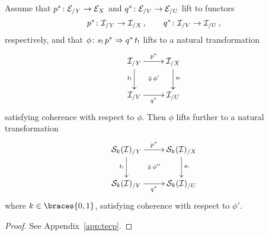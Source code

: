 \documentclass[reqno,10pt,a4paper,oneside,draft]{amsart}
\begin{document}
\begin{lemma} \label{strong-h-equiv-base-change-along-fibration-BC}
Assume that $p^* \colon \mathcal{E}_{/Y} \to \mathcal{E}_{X}$ and $q^* \colon \mathcal{E}_{/V} \to \mathcal{E}_{/U}$ lift to functors
\[
  p^* \colon \mathcal{I}_{/Y} \to \mathcal{I}_{/X}
\, , \qquad
  q^* \colon \mathcal{I}_{/V} \to \mathcal{I}_{/U}
\, ,
\]
respectively, and that  $\phi \colon s_! \, p^* \Rightarrow q^* \, t_{!}$ lifts to a natural transformation
\begin{equation} \label{strong-h-equiv-base-change-along-fibration-BC:2}
\begin{gathered}
\xymatrix{
  \cal{I}_{/Y}
  \ar[r]^{p^*}
  \ar[d]_{t_!}
  \ar@{}[dr]|{\Downarrow \, \phi'}
&
  \cal{I}_{/X}
  \ar[d]^{s_!}
\\
  \cal{I}_{/V}
  \ar[r]_{q^*}
&
  \cal{I}_{/U}
}
\end{gathered}
\end{equation}
satisfying coherence with respect to $\phi$. 
Then $\phi$ lifts further to a natural transformation 
\begin{equation} \label{strong-h-equiv-base-change-along-fibration-BC:3}
\begin{gathered}
\xymatrix{
  \cal{S}_k(\cal{I})_{/Y}
  \ar[r]^{p^*}
  \ar[d]_{t_!}
  \ar@{}[dr]|{\Downarrow \, \phi''}
&
  \cal{S}_k(\cal{I})_{/X}
  \ar[d]^{s_!}
\\
  \cal{S}_k(\cal{I})_{/V}
  \ar[r]_{q^*}
&
  \cal{S}_k(\cal{I})_{/U}
}
\end{gathered}
\end{equation}
where $k \in \braces{0, 1}$, satisfying coherence with respect to $\phi'$.
\end{lemma}

\begin{proof}
See Appendix~\ref{app:tecp}.
\end{proof}
\end{document}

